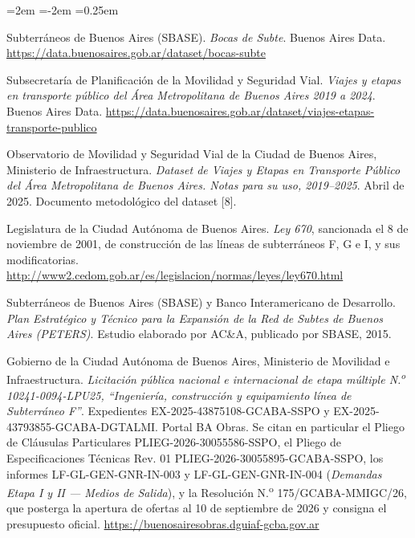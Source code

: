 \documentclass{article}
\begin{document}
\begin{list}{}{\leftmargin=2em \itemindent=-2em \itemsep=0.25em}
\item[] [7] Subterráneos de Buenos Aires (SBASE). \textit{Bocas de Subte}. Buenos Aires Data.
  \url{https://data.buenosaires.gob.ar/dataset/bocas-subte}

\item[] [8] Subsecretaría de Planificación de la Movilidad y Seguridad Vial. \textit{Viajes y etapas en
  transporte público del Área Metropolitana de Buenos Aires 2019 a 2024}. Buenos Aires Data.
  \url{https://data.buenosaires.gob.ar/dataset/viajes-etapas-transporte-publico}

\item[] [9] Observatorio de Movilidad y Seguridad Vial de la Ciudad de Buenos Aires, Ministerio de
  Infraestructura. \textit{Dataset de Viajes y Etapas en Transporte Público del Área Metropolitana de Buenos
  Aires. Notas para su uso, 2019--2025}. Abril de 2025. Documento metodológico del dataset [8].

\item[] [10] Legislatura de la Ciudad Autónoma de Buenos Aires. \textit{Ley 670}, sancionada el 8 de
  noviembre de 2001, de construcción de las líneas de subterráneos F, G e I, y sus modificatorias.
  \url{http://www2.cedom.gob.ar/es/legislacion/normas/leyes/ley670.html}

\item[] [11] Subterráneos de Buenos Aires (SBASE) y Banco Interamericano de Desarrollo. \textit{Plan
  Estratégico y Técnico para la Expansión de la Red de Subtes de Buenos Aires (PETERS)}. Estudio elaborado
  por AC\&A, publicado por SBASE, 2015.

\item[] [12] Gobierno de la Ciudad Autónoma de Buenos Aires, Ministerio de Movilidad e Infraestructura.
  \textit{Licitación pública nacional e internacional de etapa múltiple N.\textsuperscript{o}
  10241-0094-LPU25, ``Ingeniería, construcción y equipamiento línea de Subterráneo F''}. Expedientes
  EX-2025-43875108-GCABA-SSPO y EX-2025-43793855-GCABA-DGTALMI. Portal BA Obras. Se citan en particular el
  Pliego de Cláusulas Particulares PLIEG-2026-30055586-SSPO, el Pliego de Especificaciones Técnicas Rev. 01
  PLIEG-2026-30055895-GCABA-SSPO, los informes LF-GL-GEN-GNR-IN-003 y LF-GL-GEN-GNR-IN-004
  (\textit{Demandas Etapa I y II --- Medios de Salida}), y la Resolución N.\textsuperscript{o}
  175/GCABA-MMIGC/26, que posterga la apertura de ofertas al 10 de septiembre de 2026 y consigna el
  presupuesto oficial.
  \url{https://buenosairesobras.dguiaf-gcba.gov.ar}


\end{list}
\end{document}
